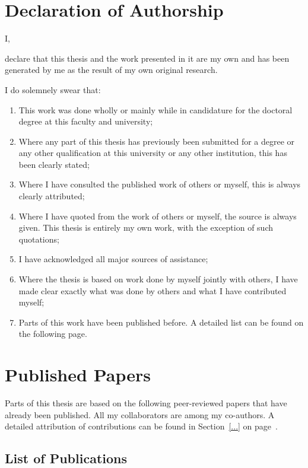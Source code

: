 
\section*{Declaration of Authorship}

I, \firstname{} \lastname{}

declare that this thesis and the work presented in it are my own and has been generated by me as the result of my own original research.

I do solemnely swear that:

\begin{enumerate}[label=\arabic*.,topsep=0pt]
	\item This work was done wholly or mainly while in candidature for the doctoral degree at this faculty and university;
	\item Where any part of this thesis has previously been submitted for a degree or any other qualification at this university or any other institution, this has been clearly stated;
	\item Where I have consulted the published work of others or myself, this is always clearly attributed;
	\item Where I have quoted from the work of others or myself, the source is always given.
		This thesis is entirely my own work, with the exception of such quotations;
	\item I have acknowledged all major sources of assistance;
	\item Where the thesis is based on work done by myself jointly with others, I have made clear exactly what was done by others and what I have contributed myself;
	\item Parts of this work have been published before.
		A detailed list can be found on the following page.
\end{enumerate}

\vspace{20pt}
{}

\newpage
\section*{Published Papers}

Parts of this thesis are based on the following peer-reviewed papers that have already been published.
All my collaborators are among my co-authors.
A detailed attribution of contributions can be found in Section~\ref{...} on page~\pageref{...}.

\subsection*{List of Publications}

\begingroup
	\def\chapter*#1{}
\endgroup

